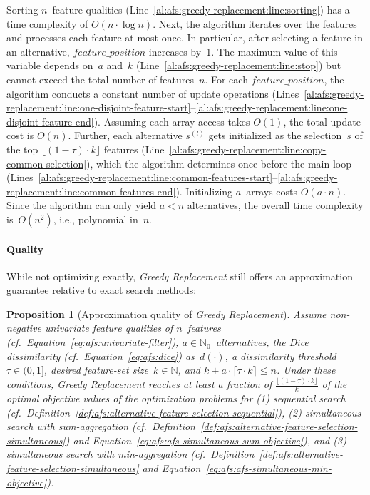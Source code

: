 \documentclass{article}
\newtheorem{proposition}{Proposition}
\theoremstyle{definition}
\begin{document}
Sorting $n$~feature qualities (Line~\ref{al:afs:greedy-replacement:line:sorting}) has a time complexity of $O(n \cdot \log n)$.
Next, the algorithm iterates over the features and processes each feature at most once.
In particular, after selecting a feature in an alternative, $\mathit{feature\_position}$ increases by~1.
The maximum value of this variable depends on~$a$ and~$k$ (Line~\ref{al:afs:greedy-replacement:line:stop}) but cannot exceed the total number of features~$n$.
For each $\mathit{feature\_position}$, the algorithm conducts a constant number of update operations (Lines~\ref{al:afs:greedy-replacement:line:one-disjoint-feature-start}--\ref{al:afs:greedy-replacement:line:one-disjoint-feature-end}).
Assuming each array access takes $O(1)$, the total update cost is $O(n)$.
Further, each alternative $s^{(l)}$ gets initialized as the selection~$s$ of the top $\lfloor (1 - \tau) \cdot k \rfloor$ features (Line~\ref{al:afs:greedy-replacement:line:copy-common-selection}), which the algorithm determines once before the main loop (Lines~\ref{al:afs:greedy-replacement:line:common-features-start}--\ref{al:afs:greedy-replacement:line:common-features-end}).
Initializing $a$~arrays costs $O(a \cdot n)$.
Since the algorithm can only yield $a < n$ alternatives, the overall time complexity is~$O(n^2)$, i.e., polynomial in~$n$.

\paragraph{Quality}

While not optimizing exactly, \emph{Greedy Replacement} still offers an approximation guarantee relative to exact search methods:
%
\begin{proposition}[Approximation quality of \emph{Greedy Replacement}]
	Assume non-negative univariate feature qualities of $n$~features (cf.~Equation~\ref{eq:afs:univariate-filter}), $a \in \mathbb{N}_0$~alternatives, the Dice dissimilarity (cf.~Equation~\ref{eq:afs:dice}) as~$d(\cdot)$, a dissimilarity threshold~$\tau \in (0,1]$, desired feature-set size~$k \in \mathbb{N}$, and $k + a \cdot \lceil \tau \cdot k \rceil \leq n$.
	Under these conditions, \emph{Greedy Replacement} reaches at least a fraction of $\frac{\lfloor (1 - \tau) \cdot k \rfloor}{k}$ of the optimal objective values of the optimization problems for (1) sequential search (cf.~Definition~\ref{def:afs:alternative-feature-selection-sequential}), (2) simultaneous search with sum-aggregation (cf.~Definition~\ref{def:afs:alternative-feature-selection-simultaneous}) and Equation~\ref{eq:afs:afs-simultaneous-sum-objective}), and (3) simultaneous search with min-aggregation (cf.~Definition~\ref{def:afs:alternative-feature-selection-simultaneous} and Equation~\ref{eq:afs:afs-simultaneous-min-objective}).
	\label{prop:afs:approximation-greedy-replacement}
\end{proposition}
\end{document}
